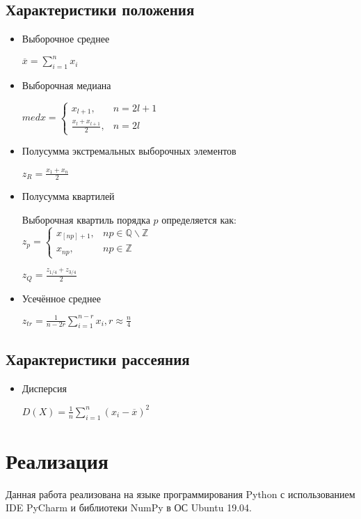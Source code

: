 \subsection{Характеристики положения}
\begin{itemize}
	\item Выборочное среднее
	
	$\overline{x}=\displaystyle \sum_{i=1}^{n} {x_i}$
	
	\item Выборочная медиана
	
	$med x =
	\begin{cases}
		x_{l+1}, & n=2l + 1 \\
		\frac{x_{l}+x_{l+1}}{2}, & n=2l
	\end{cases}
	$
	
	\item Полусумма экстремальных выборочных элементов
	
	$z_R =\frac{x_{1}+x_{n}}{2}$
	
	\item Полусумма квартилей
	
	Выборочная квартиль порядка $p$ определяется как:
	$z_p =
	\begin{cases}
	x_{[np]+1}, & np \in \mathbb{Q} \backslash \mathbb{Z} \\
	x_{np}, & np \in \mathbb{Z}
	\end{cases}
	$
	
	$z_Q =\frac{z_{1/4}+z_{3/4}}{2}$
	
	\item Усечённое среднее
	
	$z_{tr}=\frac{1}{n-2r}\displaystyle \sum_{i=1}^{n-r} x_{i}, r \approx \frac{n}{4}$
\end{itemize}

\subsection{Характеристики рассеяния}
\begin{itemize}
	\item Дисперсия
	
	$D(X)=\frac{1}{n}\displaystyle \sum_{i=1}^{n}(x_i-\overline{x})^2$
	
\end{itemize}
\section{Реализация}
Данная работа реализована на языке программирования Python с использованием IDE PyCharm и библиотеки NumPy в ОС Ubuntu 19.04.

